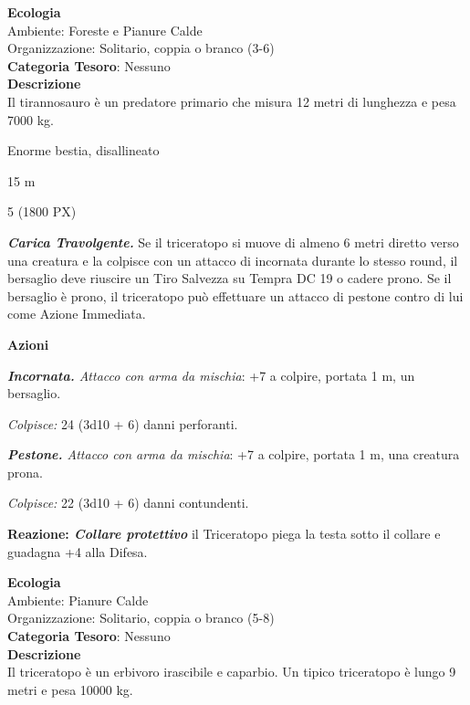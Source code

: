 \begin{multicols}{2}
{\textbf{Ecologia}\\
Ambiente: Foreste e Pianure Calde\\
Organizzazione: Solitario, coppia o branco (3-6)\\
\textbf{Categoria Tesoro}: Nessuno\\
\textbf{Descrizione}\\
Il tirannosauro è un predatore primario che misura 12 metri di lunghezza e pesa 7000 kg.

\begin{description}[noitemsep, topsep=0pt, parsep=0pt, partopsep=0pt, itemsep=1pt, leftmargin=2.35cm,  labelwidth=2.2cm, itemindent=0cm, listparindent=0pt] %
\setlength{\baselineskip}{10pt}
\item[\textbf{Taglia/Tipo}] Enorme bestia, disallineato
\item[\textbf{Caratt.}] 
\item[\textbf{Punti Ferita}] 
\item[\textbf{Movimento}] 15 m
\item[\textbf{Tiri Salvez.}] 
\item[\textbf{Sfida}] 5 (1800 PX)
\end{description}
\smallskip

\emph{\textbf{Carica Travolgente.}} Se il triceratopo si muove di almeno 6 metri diretto verso una creatura e la colpisce con un attacco di incornata durante lo stesso round, il bersaglio deve riuscire un Tiro Salvezza su Tempra DC 19 o cadere prono. Se il bersaglio è prono, il triceratopo può effettuare un attacco di pestone contro di lui come Azione Immediata.

\textbf{Azioni}

\emph{\textbf{Incornata.} Attacco con arma da mischia}: +7 a colpire, portata 1 m, un bersaglio.

\emph{Colpisce:} 24 (3d10 + 6) danni perforanti.

\emph{\textbf{Pestone.} Attacco con arma da mischia}: +7 a colpire, portata 1 m, una creatura prona.

\emph{Colpisce:} 22 (3d10 + 6) danni contundenti.

\textbf{Reazione: \emph{Collare protettivo}} il Triceratopo piega la testa sotto il collare e guadagna +4 alla Difesa.

\textbf{Ecologia}\\
Ambiente: Pianure Calde\\
Organizzazione: Solitario, coppia o branco (5-8)\\
\textbf{Categoria Tesoro}: Nessuno\\
\textbf{Descrizione}\\
Il triceratopo è un erbivoro irascibile e caparbio. Un tipico triceratopo è lungo 9 metri e pesa 10000 kg.

}
\end{multicols}
